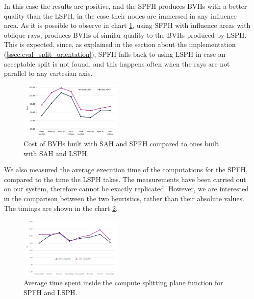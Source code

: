 \documentclass[acmtog, anonymous, review]{acmart}
\begin{document}
In this case the results are positive, and the SPFH produces BVHs with a better quality than the LSPH, in the case their nodes are immersed in any influence area. As it is possible to observe in chart \ref{fig:spfh_isolation}, using SFPH with influence areas with oblique rays, produces BVHs of similar quality to the BVHs produced by LSPH. This is expected, since, as explained in the section about the implementation (\ref{ssec:eval_split_orientation}), SPFH falls back to using LSPH in case an acceptable split is not found, and this happens often when the rays are not parallel to any cartesian axis.

\begin{figure}[H]
	\centering
	\includegraphics[width=0.45\textwidth]{Images/spfh_isolation.png}
	\caption{Cost of BVHs built with SAH and SPFH compared to ones built with SAH and LSPH.}
	\label{fig:spfh_isolation}
\end{figure}

We also measured the average execution time of the computations for the SPFH, compared to the time the LSPH takes. The measurements have been carried out on our system, therefore cannot be exactly replicated. However, we are interested in the comparison between the two heuristics, rather than their absolute values. The timings are shown in the chart \ref{fig:spfh_build_time_chart}.

\begin{figure}[H]
	\centering
	\includegraphics[width=0.45\textwidth]{Images/spfh_build_time_chart.png}
	\caption{Average time spent inside the compute splitting plane function for SPFH and LSPH.}
	\label{fig:spfh_build_time_chart}
\end{figure}
\end{document}
